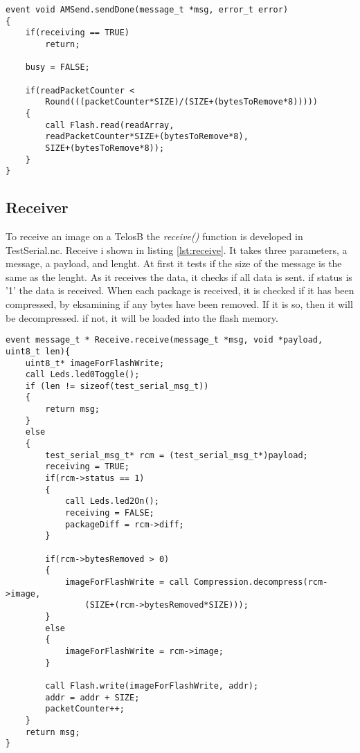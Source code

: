 \begin{lstlisting}[caption={the function AMSend.sendDone}, label=lst:]
event void AMSend.sendDone(message_t *msg, error_t error)
{
	if(receiving == TRUE)
		return;
	
	busy = FALSE;
	
	if(readPacketCounter < 
		Round(((packetCounter*SIZE)/(SIZE+(bytesToRemove*8)))))
	{	
		call Flash.read(readArray, 
		readPacketCounter*SIZE+(bytesToRemove*8),
		SIZE+(bytesToRemove*8));
	}
}
\end{lstlisting}

\subsection{Receiver}
To receive an image on a TelosB the \emph{receive()} function is developed in TestSerial.nc. Receive i shown in listing \ref{lst:receive}. It takes three parameters, a message, a payload, and lenght. At first it tests if the size of the message is the same as the lenght. As it receives the data, it checks if all data is sent. if status is '1' the data is received. When each package is received, it is checked if it has been compressed, by eksamining if any bytes have been removed. If it is so, then it will be decompressed. if not, it will be loaded into the flash memory.

\begin{lstlisting}[label=lst:receive, caption=Receive function in TestSerialC.nc]
event message_t * Receive.receive(message_t *msg, void *payload,
uint8_t len){
	uint8_t* imageForFlashWrite;
	call Leds.led0Toggle();
	if (len != sizeof(test_serial_msg_t)) 
	{
		return msg;
	}
	else 
	{ 	     
		test_serial_msg_t* rcm = (test_serial_msg_t*)payload;
		receiving = TRUE;
		if(rcm->status == 1)
		{
			call Leds.led2On();			
			receiving = FALSE;
			packageDiff = rcm->diff;
		}
		
		if(rcm->bytesRemoved > 0)
		{
			imageForFlashWrite = call Compression.decompress(rcm->image,
				(SIZE+(rcm->bytesRemoved*SIZE)));
		}
		else
		{
			imageForFlashWrite = rcm->image;
		}
		
		call Flash.write(imageForFlashWrite, addr);
		addr = addr + SIZE;
		packetCounter++;
	}
	return msg;
}
\end{lstlisting}